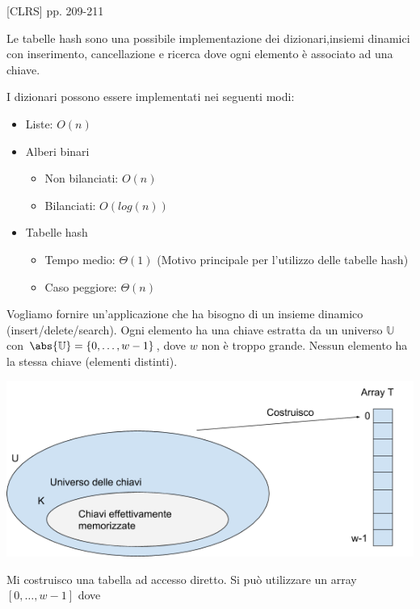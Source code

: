 \documentclass[tikz]{article}
\providecommand{\tightlist}{%
  \setlength{\itemsep}{0pt}\setlength{\parskip}{0pt}}
\begin{document}
{{[}CLRS{]} pp. 209-211}

{Le tabelle hash sono una possibile implementazione dei dizionari,insiemi dinamici con inserimento, cancellazione e ricerca dove ogni elemento è associato ad una chiave.}

{I dizionari possono essere implementati nei seguenti modi:}

\begin{itemize}
\tightlist
\item
  {Liste: $O(n)$}
\item
	{Alberi binari}
	
\begin{itemize}
\tightlist
\item
  	{Non bilanciati: $O(n)$}
\item
  	{Bilanciati: $O(log(n))$}
\end{itemize}

\item
  	{Tabelle hash}
  	
\begin{itemize}
\tightlist
\item
	{Tempo medio: $\Theta(1)$ (Motivo principale per l'utilizzo delle tabelle hash)}
\item
	{Caso peggiore: $\Theta(n)$}
\end{itemize}

\end{itemize}

{Vogliamo fornire un'applicazione che ha bisogno di un insieme dinamico (insert/delete/search). Ogni elemento ha una chiave estratta da un universo $\mathbb{U}$ con $\abs{\mathbb{U}} = \{0,\ldots,w-1\}$, dove $w$ non è troppo grande. Nessun elemento ha la stessa chiave (elementi distinti). }

{\includegraphics{images/image521.png}}

{Mi costruisco una tabella ad accesso diretto. Si può utilizzare un array $[0,\ldots,w-1]$ dove}
\end{document}
